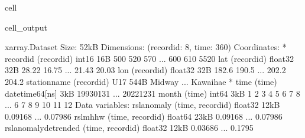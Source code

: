 \documentclass[letterpaper,10pt,english]{jupyterBook}
\begin{document}
\begin{sphinxuseclass}{cell}
\begin{sphinxVerbatimOutput}
\begin{sphinxuseclass}{cell_output}
\begin{sphinxVerbatim}[commandchars=\\\{\}]
\PYGZlt{}xarray.Dataset\PYGZgt{} Size: 52kB
Dimensions:                (record\PYGZus{}id: 8, time: 360)
Coordinates:
  * record\PYGZus{}id              (record\PYGZus{}id) int16 16B 500 520 570 ... 600 610 5520
    lat                    (record\PYGZus{}id) float32 32B 28.22 16.75 ... 21.43 20.03
    lon                    (record\PYGZus{}id) float32 32B 182.6 190.5 ... 202.2 204.2
    station\PYGZus{}name           (record\PYGZus{}id) \PYGZlt{}U17 544B \PYGZsq{}Midway\PYGZsq{} ... \PYGZsq{}Kawaihae\PYGZsq{}
  * time                   (time) datetime64[ns] 3kB 1993\PYGZhy{}01\PYGZhy{}31 ... 2022\PYGZhy{}12\PYGZhy{}31
    month                  (time) int64 3kB 1 2 3 4 5 6 7 8 ... 6 7 8 9 10 11 12
Data variables:
    rsl\PYGZus{}anomaly            (time, record\PYGZus{}id) float32 12kB \PYGZhy{}0.09168 ... \PYGZhy{}0.07986
    rsl\PYGZus{}mhhw               (time, record\PYGZus{}id) float64 23kB \PYGZhy{}0.09168 ... \PYGZhy{}0.07986
    rsl\PYGZus{}anomaly\PYGZus{}detrended  (time, record\PYGZus{}id) float32 12kB \PYGZhy{}0.03686 ... \PYGZhy{}0.1795
\end{sphinxVerbatim}

\end{sphinxuseclass}\end{sphinxVerbatimOutput}

\end{sphinxuseclass}
\end{document}
